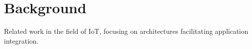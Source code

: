 \chapter{Background}
Related work in the field of IoT, focusing on architectures facilitating application integration.